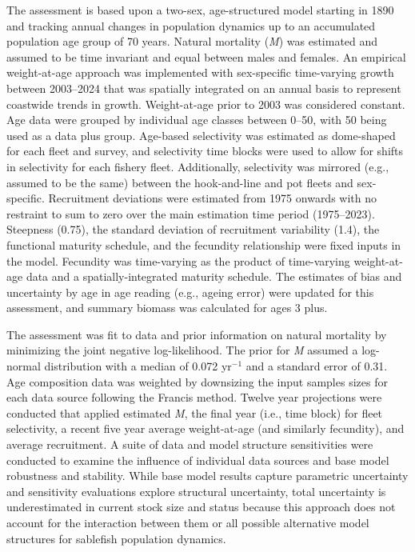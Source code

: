 \documentclass[
  english,
]{article}
\begin{document}
The assessment is based upon a two-sex, age-structured model starting in
1890 and tracking annual changes in population dynamics up to an
accumulated population age group of 70 years. Natural mortality
(\emph{M}) was estimated and assumed to be time invariant and equal
between males and females. An empirical weight-at-age approach was
implemented with sex-specific time-varying growth between 2003--2024
that was spatially integrated on an annual basis to represent coastwide
trends in growth. Weight-at-age prior to 2003 was considered constant.
Age data were grouped by individual age classes between 0--50, with 50
being used as a data plus group. Age-based selectivity was estimated as
dome-shaped for each fleet and survey, and selectivity time blocks were
used to allow for shifts in selectivity for each fishery fleet.
Additionally, selectivity was mirrored (e.g., assumed to be the same)
between the hook-and-line and pot fleets and sex-specific. Recruitment
deviations were estimated from 1975 onwards with no restraint to sum to
zero over the main estimation time period (1975--2023). Steepness
(0.75), the standard deviation of recruitment variability (1.4), the
functional maturity schedule, and the fecundity relationship were fixed
inputs in the model. Fecundity was time-varying as the product of
time-varying weight-at-age data and a spatially-integrated maturity
schedule. The estimates of bias and uncertainty by age in age reading
(e.g., ageing error) were updated for this assessment, and summary
biomass was calculated for ages 3 plus.

The assessment was fit to data and prior information on natural
mortality by minimizing the joint negative log-likelihood. The prior for
\emph{M} assumed a log-normal distribution with a median of 0.072
yr\(^{-1}\) and a standard error of 0.31. Age composition data was
weighted by downsizing the input samples sizes for each data source
following the Francis method. Twelve year projections were conducted
that applied estimated \emph{M}, the final year (i.e., time block) for
fleet selectivity, a recent five year average weight-at-age (and
similarly fecundity), and average recruitment. A suite of data and model
structure sensitivities were conducted to examine the influence of
individual data sources and base model robustness and stability. While
base model results capture parametric uncertainty and sensitivity
evaluations explore structural uncertainty, total uncertainty is
underestimated in current stock size and status because this approach
does not account for the interaction between them or all possible
alternative model structures for sablefish population dynamics.
\end{document}
